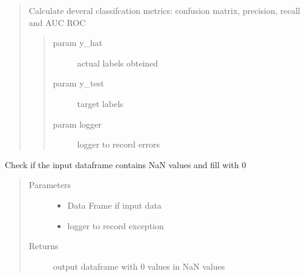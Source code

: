 \documentclass[letterpaper,10pt,english]{sphinxmanual}
\begin{document}
\begin{fulllineitems}
\label{\detokenize{index:dummy_project_utils.calculate_classification_metrics}}
\sphinxAtStartPar
{}
\begin{quote}

\sphinxAtStartPar
Calculate deveral classifcation metrics: confusion matrix, precision, recall and AUC ROC
\begin{quote}\begin{description}
\item[{param y\_hat}] \leavevmode
\sphinxAtStartPar
actual labels obteined

\item[{param y\_test}] \leavevmode
\sphinxAtStartPar
target labels

\item[{param logger}] \leavevmode
\sphinxAtStartPar
logger to record errors

\end{description}\end{quote}
\end{quote}

\end{fulllineitems}


\begin{fulllineitems}
\label{\detokenize{index:dummy_project_utils.check_nan}}
\sphinxAtStartPar
{}

\sphinxAtStartPar
Check if the input dataframe contains NaN values and fill with 0
\begin{quote}\begin{description}
\item[{Parameters}] \leavevmode\begin{itemize}
\item {} 
\sphinxAtStartPar
{} \textendash{} Data Frame if input data

\item {} 
\sphinxAtStartPar
{} \textendash{} logger to record exception

\end{itemize}

\item[{Returns}] \leavevmode
\sphinxAtStartPar
output dataframe with 0 values in NaN values

\end{description}\end{quote}

\end{fulllineitems}
\end{document}
